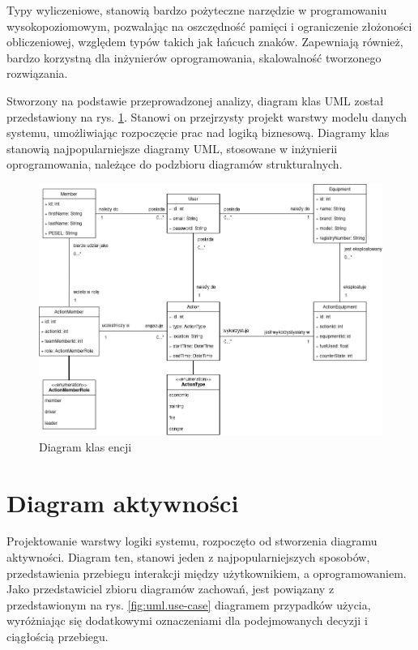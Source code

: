 Typy wyliczeniowe, stanowią bardzo pożyteczne narzędzie w programowaniu wysokopoziomowym, pozwalając na  oszczędność pamięci i ograniczenie złożoności obliczeniowej, względem typów takich jak łańcuch znaków. Zapewniają również, bardzo korzystną dla inżynierów oprogramowania, skalowalność tworzonego rozwiązania.

Stworzony na podstawie przeprowadzonej analizy, diagram klas UML został przedstawiony na rys. \ref{fig:uml.classes}. Stanowi on przejrzysty projekt warstwy modelu danych systemu, umożliwiając rozpoczęcie prac nad logiką biznesową. Diagramy klas stanowią najpopularniejsze diagramy UML, stosowane w inżynierii oprogramowania, należące do podzbioru diagramów strukturalnych.

\begin{figure}[!htbp]
    \centering
    \includegraphics[width=\textwidth]{img/chapter4/open-osp.uml-diagrams-classes.png}
    \caption{Diagram klas encji}
    \label{fig:uml.classes}
\end{figure}

\section{Diagram aktywności}

Projektowanie warstwy logiki systemu, rozpoczęto od stworzenia diagramu aktywności. Diagram ten, stanowi jeden z najpopularniejszych sposobów, przedstawienia przebiegu interakcji między użytkownikiem, a oprogramowaniem. Jako przedstawiciel zbioru diagramów zachowań, jest powiązany z przedstawionym na rys. \ref{fig:uml.use-case} diagramem przypadków użycia, wyróżniając się dodatkowymi oznaczeniami dla podejmowanych decyzji i ciągłością przebiegu.

